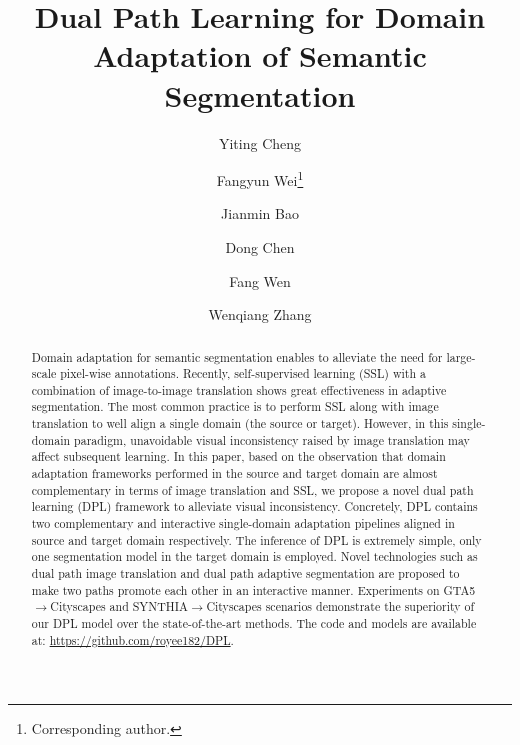 \documentclass[10pt,twocolumn,letterpaper]{article}
\newcommand*\samethanks[1][\value{footnote}]{\footnotemark[#1]}
\begin{document}
\title{Dual Path Learning for Domain Adaptation of Semantic Segmentation\vspace{-0.5cm}}
\author[1]{Yiting Cheng}
\author[2]{\hspace{0.3cm}Fangyun Wei\thanks{Corresponding author.}}
\author[2]{\hspace{0.3cm}Jianmin Bao}
\author[2]{\hspace{0.3cm}Dong Chen}
\author[2]{\hspace{0.3cm}Fang Wen}
\author[1]{\hspace{0.3cm}Wenqiang Zhang\samethanks[1]\vspace{-0.3cm}}
\maketitle

\begin{abstract}
 Domain adaptation for semantic segmentation enables to alleviate the need for large-scale pixel-wise annotations. Recently, self-supervised learning (SSL) with a combination of image-to-image translation shows great effectiveness in adaptive segmentation. The most common practice is to perform SSL along with image translation to well align a single domain (the source or target). However, in this single-domain paradigm, unavoidable visual inconsistency raised by image translation may affect subsequent learning. In this paper, based on the observation that domain adaptation frameworks performed in the source and target domain are almost complementary in terms of image translation and SSL, we propose a novel dual path learning (DPL) framework to alleviate visual inconsistency. Concretely, DPL contains two complementary and interactive single-domain adaptation pipelines aligned in source and target domain respectively. The inference of DPL is extremely simple, only one segmentation model in the target domain is employed. Novel technologies such as dual path image translation and dual path adaptive segmentation are proposed to make two paths promote each other in an interactive manner. Experiments on GTA5$\rightarrow$Cityscapes and SYNTHIA$\rightarrow$Cityscapes scenarios demonstrate the superiority of our DPL model over the state-of-the-art methods. The code and models are available at: \url{https://github.com/royee182/DPL}.
\end{abstract}
\end{document}

